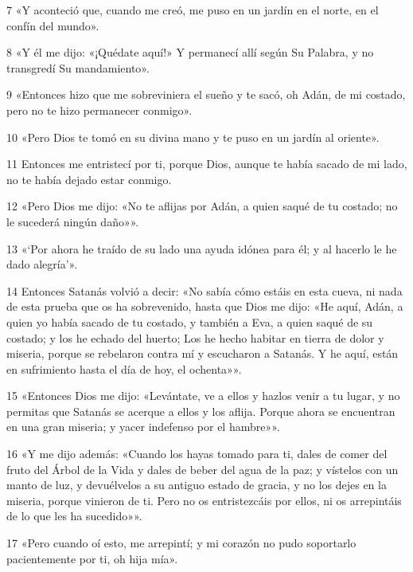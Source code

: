 \par 7 «Y aconteció que, cuando me creó, me puso en un jardín en el norte, en el confín del mundo».

\par 8 «Y él me dijo: «¡Quédate aquí!» Y permanecí allí según Su Palabra, y no transgredí Su mandamiento».

\par 9 «Entonces hizo que me sobreviniera el sueño y te sacó, oh Adán, de mi costado, pero no te hizo permanecer conmigo».

\par 10 «Pero Dios te tomó en su divina mano y te puso en un jardín al oriente».

\par 11 Entonces me entristecí por ti, porque Dios, aunque te había sacado de mi lado, no te había dejado estar conmigo.

\par 12 «Pero Dios me dijo: «No te aflijas por Adán, a quien saqué de tu costado; no le sucederá ningún daño»».

\par 13 «‘Por ahora he traído de su lado una ayuda idónea para él; y al hacerlo le he dado alegría’».

\par 14 Entonces Satanás volvió a decir: «No sabía cómo estáis en esta cueva, ni nada de esta prueba que os ha sobrevenido, hasta que Dios me dijo: «He aquí, Adán, a quien yo había sacado de tu costado, y también a Eva, a quien saqué de su costado; y los he echado del huerto; Los he hecho habitar en tierra de dolor y miseria, porque se rebelaron contra mí y escucharon a Satanás. Y he aquí, están en sufrimiento hasta el día de hoy, el ochenta»».

\par 15 «Entonces Dios me dijo: «Levántate, ve a ellos y hazlos venir a tu lugar, y no permitas que Satanás se acerque a ellos y los aflija. Porque ahora se encuentran en una gran miseria; y yacer indefenso por el hambre»».

\par 16 «Y me dijo además: «Cuando los hayas tomado para ti, dales de comer del fruto del Árbol de la Vida y dales de beber del agua de la paz; y vístelos con un manto de luz, y devuélvelos a su antiguo estado de gracia, y no los dejes en la miseria, porque vinieron de ti. Pero no os entristezcáis por ellos, ni os arrepintáis de lo que les ha sucedido»».

\par 17 «Pero cuando oí esto, me arrepintí; y mi corazón no pudo soportarlo pacientemente por ti, oh hija mía».

